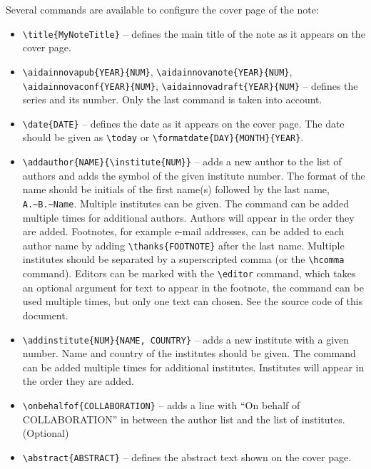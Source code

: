 Several \latex commands are available to configure the cover page of the note:
\begin{itemize}
  \item \texttt{\textbackslash title\{MyNoteTitle\}} -- defines the main title of the note as it appears on the cover page.
  \item \texttt{\textbackslash aidainnovapub\{YEAR\}\{NUM\}}, \texttt{\textbackslash aidainnovanote\{YEAR\}\{NUM\}},\\\texttt{\textbackslash aidainnovaconf\{YEAR\}\{NUM\}}, \texttt{\textbackslash aidainnovadraft\{YEAR\}\{NUM\}} -- defines the series and its number. Only the last command is taken into account.
  \item \texttt{\textbackslash date\{DATE\}} -- defines the date as it appears on the cover page. The date should be given as \texttt{\textbackslash today} or \texttt{\textbackslash formatdate\{DAY\}\{MONTH\}\{YEAR\}}.
  \item \texttt{\textbackslash addauthor\{NAME\}\{\textbackslash institute\{NUM\}\}} -- adds a new author to the list of authors and adds the symbol of the given institute number. The format of the name should be initials of the first name(s) followed by the last name, \ie \texttt{A.\textasciitilde B.\textasciitilde Name}. Multiple institutes can be given. The command can be added multiple times for additional authors. Authors will appear in the order they are added. Footnotes, for example e-mail addresses, can be added to each author name by adding \texttt{\textbackslash thanks\{FOOTNOTE\}} after the last name. Multiple institutes should be separated by a superscripted comma (or the \texttt{\textbackslash hcomma} command). Editors can be marked with the \texttt{\textbackslash editor} command, which takes an optional argument for text to appear in the footnote, the command can be used multiple times, but only one text can chosen. See the source code of this document.
  \item \texttt{\textbackslash addinstitute\{NUM\}\{NAME, COUNTRY\}} -- adds a new institute with a given number. Name and country of the institutes should be given. The command can be added multiple times for additional institutes. Institutes will appear in the order they are added.
  \item \texttt{\textbackslash onbehalfof\{COLLABORATION\}} -- adds a line with ``On behalf of COLLABORATION'' in between the author list and the list of institutes. (Optional)
  \item \texttt{\textbackslash abstract\{ABSTRACT\}} -- defines the abstract text shown on the cover page.

\end{itemize}
